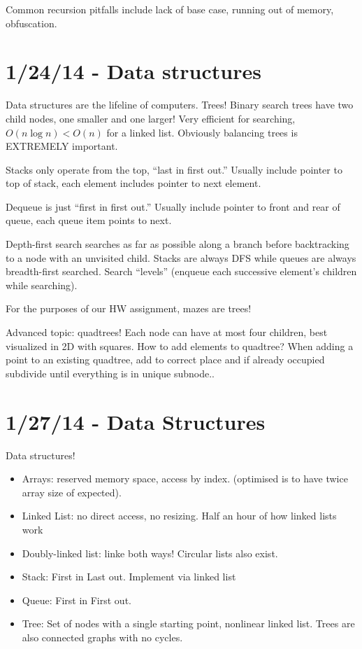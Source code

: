 \documentclass[10pt, twocolumn]{article}
\begin{document}
Common recursion pitfalls include lack of base case, running out of memory, obfuscation. 
\section{1/24/14 - Data structures}

Data structures are the lifeline of computers. Trees! Binary search trees have two child nodes, one smaller and one larger! Very efficient for searching, $O(n\log n) < O(n)$ for a linked list. Obviously balancing trees is EXTREMELY important. 

Stacks only operate from the top, ``last in first out.'' Usually include pointer to top of stack, each element includes pointer to next element.

Dequeue is just ``first in first out.'' Usually include pointer to front and rear of queue, each queue item points to next.

Depth-first search searches as far as possible along a branch before backtracking to a node with an unvisited child. Stacks are always DFS while queues are always breadth-first searched. Search ``levels'' (enqueue each successive element's children while searching). 

For the purposes of our HW assignment, mazes are trees!

Advanced topic: quadtrees! Each node can have at most four children, best visualized in 2D with squares. How to add elements to quadtree? When adding a point to an existing quadtree, add to correct place and if already occupied subdivide until everything is in unique subnode..
\section{1/27/14 - Data Structures}

Data structures! 
\begin{itemize}
    \item Arrays: reserved memory space, access by index. (optimised is to have twice array size of expected). 
    \item Linked List: no direct access, no resizing. Half an hour of how linked lists work
    \item Doubly-linked list: linke both ways! Circular lists also exist.
    \item Stack: First in Last out. Implement via linked list
    \item Queue: First in First out.
    \item Tree: Set of nodes with a single starting point, nonlinear linked list. Trees are also connected graphs with no cycles.
\end{itemize}
\end{document}
